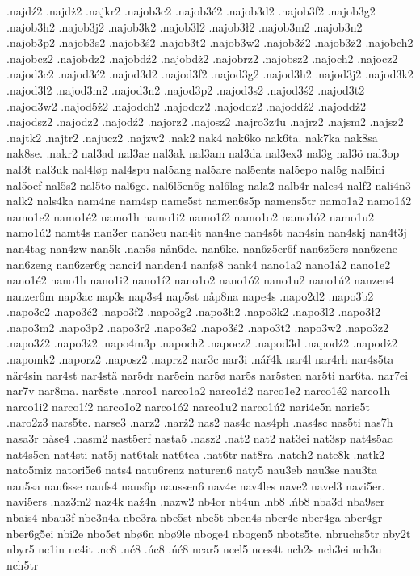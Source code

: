 {{.najdź2
.najdż2
.najkr2
.najob3c2
.najob3ć2
.najob3d2
.najob3f2
.najob3g2
.najob3h2
.najob3j2
.najob3k2
.najob3l2
.najob3ł2
.najob3m2
.najob3n2
.najob3p2
.najob3s2
.najob3ś2
.najob3t2
.najob3w2
.najob3ź2
.najob3ż2
.najobch2
.najobcz2
.najobdz2
.najobdź2
.najobdż2
.najobrz2
.najobsz2
.najoch2
.najocz2
.najod3c2
.najod3ć2
.najod3d2
.najod3f2
.najod3g2
.najod3h2
.najod3j2
.najod3k2
.najod3l2
.najod3m2
.najod3n2
.najod3p2
.najod3s2
.najod3ś2
.najod3t2
.najod3w2
.najod5ż2
.najodch2
.najodcz2
.najoddz2
.najoddź2
.najoddż2
.najodsz2
.najodz2
.najodź2
.najorz2
.najosz2
.najro3z4u
.najrz2
.najsm2
.najsz2
.najtk2
.najtr2
.najucz2
.najzw2
.nak2
nak4
nak6ko
nak6ta.
nak7ka
nak8sa
nak8se.
.nakr2
nal3ad
nal3ae
nal3ak
nal3am
nal3da
nal3ex3
nal3g
nal3ö
nal3op
nal3t
nal3uk
nal4løp
nal4spu
nal5ang
nal5are
nal5ents
nal5epo
nal5g
nal5ini
nal5oef
nal5s2
nal5to
nal6ge.
nal6l5en6g
nal6lag
nala2
nalb4r
nales4
nalf2
nali4n3
nalk2
nals4ka
nam4ne
nam4sp
name5st
namen6s5p
namens5tr
namo1a2
namo1á2
namo1e2
namo1é2
namo1h
namo1i2
namo1í2
namo1o2
namo1ó2
namo1u2
namo1ú2
namt4s
nan3er
nan3eu
nan4it
nan4ne
nan4s5t
nan4sin
nan4skj
nan4t3j
nan4tag
nan4zw
nan5k
.nan5s
nån6de.
nan6ke.
nan6z5er6f
nan6z5ers
nan6zene
nan6zeng
nan6zer6g
nanci4
nanden4
nanfø8
nank4
nano1a2
nano1á2
nano1e2
nano1é2
nano1h
nano1i2
nano1í2
nano1o2
nano1ó2
nano1u2
nano1ú2
nanzen4
nanzer6m
nap3ac
nap3s
nap3s4
nap5st
nåp8na
nape4s
.napo2d2
.napo3b2
.napo3c2
.napo3ć2
.napo3f2
.napo3g2
.napo3h2
.napo3k2
.napo3l2
.napo3ł2
.napo3m2
.napo3p2
.napo3r2
.napo3s2
.napo3ś2
.napo3t2
.napo3w2
.napo3z2
.napo3ź2
.napo3ż2
.napo4m3p
.napoch2
.napocz2
.napod3d
.napodź2
.napodż2
.napomk2
.naporz2
.naposz2
.naprz2
nar3c
nar3i
.nář4k
nar4l
nar4rh
nar4s5ta
när4sin
nar4st
nar4stä
nar5dr
nar5ein
nar5ø
nar5s
nar5sten
nar5ti
nar6ta.
nar7ei
nar7v
nar8ma.
nar8ste
.narco1
narco1a2
narco1á2
narco1e2
narco1é2
narco1h
narco1i2
narco1í2
narco1o2
narco1ó2
narco1u2
narco1ú2
nari4e5n
narie5t
.naro2z3
nars5te.
narse3
.narz2
.narż2
nas2
nas4c
nas4ph
.nas4sc
nas5ti
nas7h
nasa3r
nåse4
.nasm2
nast5erf
nasta5
.nasz2
.nat2
nat2
nat3ei
nat3sp
nat4s5ac
nat4s5en
nat4sti
nat5j
nat6tak
nat6tea
.nat6tr
nat8ra
.natch2
nate8k
.natk2
nato5miz
natori5e6
nats4
natu6renz
naturen6
naty5
nau3eb
nau3se
nau3ta
nau5sa
nau6sse
naufs4
naus6p
naussen6
nav4e
nav4les
nave2
navel3
navi5er.
navi5ers
.naz3m2
naz4k
naž4n
.nazw2
nb4or
nb4un
.nb8
.ńb8
nba3d
nba9ser
nbais4
nbau3f
nbe3n4a
nbe3ra
nbe5st
nbe5t
nben4s
nber4e
nber4ga
nber4gr
nber6g5ei
nbi2e
nbo5et
nbø6n
nbø9le
nboge4
nbogen5
nbots5te.
nbruchs5tr
nby2t
nbyr5
nc1in
nc4it
.nc8
.nć8
.ńc8
.ńć8
ncar5
ncel5
nces4t
nch2s
nch3ei
nch3u
nch5tr
}}
